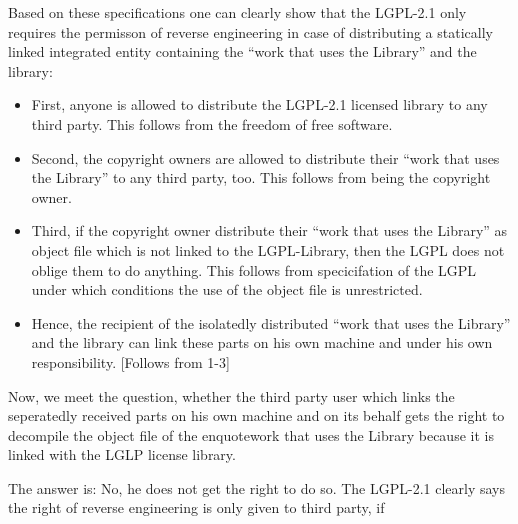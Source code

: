 Based on these specifications one can clearly show that the LGPL-2.1 only
requires the permisson of reverse engineering in case of distributing a
statically linked integrated entity containing the \enquote{work that uses the
Library} and the library:

\begin{itemize}
\item First, anyone is allowed to distribute the LGPL-2.1 licensed library to
any third party. This follows from the freedom of free software.

\item Second, the copyright owners are allowed to distribute their \enquote{work
that uses the Library} to any third party, too. This follows from being the copyright
owner.

\item Third, if the copyright owner distribute their \enquote{work that
uses the Library} as object file which is not linked to the LGPL-Library, then
the LGPL does not oblige them to do anything. This follows from specicifation of
the LGPL under which conditions the use of the object file is unrestricted.

\item Hence, the recipient of the isolatedly distributed \enquote{work
that uses the Library} and the library can link these parts on his own machine
and under his own responsibility. [Follows from 1-3]
\end{itemize}

Now, we meet the question, whether the third party user which links the
seperatedly received parts on his own machine and on its behalf gets the right
to decompile the object file of the enquote{work that uses the Library} because it
is linked with the LGLP license library.

The answer is: No, he does not get the right to do so. The LGPL-2.1 clearly says
the right of reverse engineering is only given to third party, if 

%

